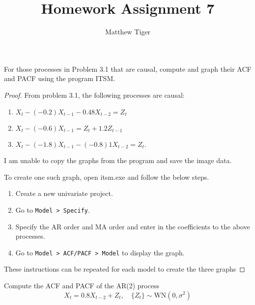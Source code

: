\documentclass[12pt]{article}
\title{Homework Assignment 7}
\author{Matthew Tiger}
\theoremstyle{definition}
\newenvironment{custompbm}[1]
  {\renewcommand\theproblem{#1}\problem}
  {\endproblem}
\begin{document}
\maketitle



\begin{custompbm}{3.2}
  For those processes in Problem 3.1 that are causal, compute and graph their
  ACF and PACF using the program ITSM.
\end{custompbm}

\begin{proof}
  From problem 3.1, the following processes are causal:
  \begin{enumerate}
    \item $X_t - (-0.2)X_{t-1} - 0.48X_{t-2} = Z_t$
    \item $X_t - (-0.6)X_{t-1} = Z_t + 1.2Z_{t-1}$
    \item $X_t - (-1.8)X_{t-1} - (-0.8)1X_{t-2} = Z_t$.
  \end{enumerate}

  I am unable to copy the graphs from the program and save the image data.

  To create one such graph, open itsm.exe and follow the below steps.
  \begin{enumerate}
    \item Create a new univariate project.
    \item Go to \texttt{Model > Specify}.
    \item Specify the AR order and MA order and enter in the coefficients to the above processes.
      \item Go to \texttt{Model > ACF/PACF > Model} to display the graph.
  \end{enumerate}
  These instructions can be repeated for each model to create the three graphs
\end{proof}


\begin{custompbm}{3.4}
  Compute the ACF and PACF of the AR(2) process
  \[
    X_t = 0.8X_{t-2} + Z_t, \quad \{Z_t\} \sim \text{WN}(0, \sigma ^2)
  \]
\end{custompbm}
\end{document}
